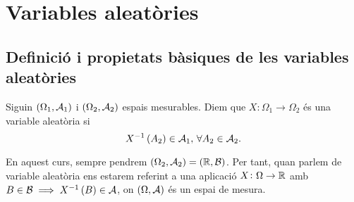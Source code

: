 \chapter{Variables aleatòries}

\section[Definició i propietats bàsiques de les variables aleatòries]
    {Definició i propietats bàsiques de les variables aleatòries
    }

\begin{defi}
    Siguin $\left( \Omega_1, \mathcal{A}_1\right)$ i $\left( \Omega_2, \mathcal{A}_2\right)$ espais mesurables. Diem que $X\colon \Omega_1\to\Omega_2$ és una variable aleatòria si
    \[
        X^{-1}\left( A_2\right)\in\mathcal{A}_1,\,\forall A_2\in\mathcal{A}_2.
    \]
\end{defi}
\noindent En aquest curs, sempre pendrem $\left( \Omega_2, \mathcal{A}_2\right)=\left( \mathbb{R},\mathcal{B}\right)$. Per tant, quan parlem de variable aleatòria ens estarem referint a una aplicació $X\colon\Omega\to\mathbb{R}$ amb $B\in\mathcal{B}\implies X^{-1}\left( B\right)\in\mathcal{A}$, on $\left( \Omega, \mathcal{A}\right)$ és un espai de mesura.
